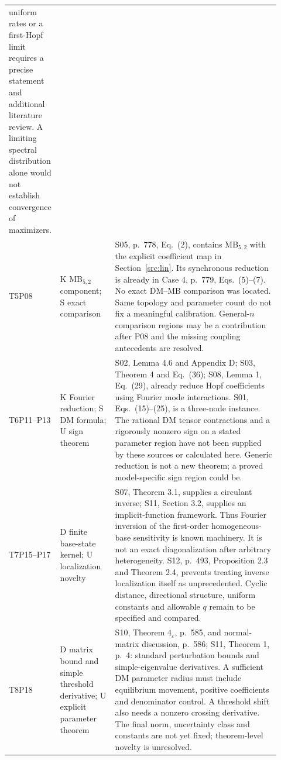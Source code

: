 \begin{longtable}{@{}>{\raggedright\arraybackslash}p{0.12\linewidth}>{\raggedright\arraybackslash}p{0.20\linewidth}>{\raggedright\arraybackslash}p{0.60\linewidth}@{}}
uniform rates or a first-Hopf limit requires a precise statement
and additional literature review. A limiting spectral distribution
alone would not establish convergence of maximizers.\\[5pt]
T5\newline P08 & K MB$_{5,2}$ component; S exact comparison &
S05, p.~778, Eq.~(2), contains MB$_{5,2}$ with the explicit coefficient
map in Section~\ref{src:lin}. Its synchronous reduction is already
in Case 4, p.~779, Eqs.~(5)--(7). No exact DM--MB comparison was
located. Same topology and parameter count do not fix a meaningful
calibration. General-$n$ comparison regions may be a contribution
after P08 and the missing coupling antecedents are resolved.\\[5pt]
T6\newline P11--P13 & K Fourier reduction; S DM formula; U sign theorem &
S02, Lemma 4.6 and Appendix D; S03, Theorem 4 and Eq.~(36);
S08, Lemma 1, Eq.~(29), already reduce Hopf coefficients using
Fourier mode interactions. S01, Eqs.~(15)--(25), is a three-node
instance. The rational DM tensor contractions and a rigorously
nonzero sign on a stated parameter region have not been supplied
by these sources or calculated here. Generic reduction is not a
new theorem; a proved model-specific sign region could be.\\[5pt]
T7\newline P15--P17 & D finite base-state kernel; U localization novelty &
S07, Theorem 3.1, supplies a circulant inverse; S11, Section 3.2,
supplies an implicit-function framework. Thus Fourier inversion of
the first-order homogeneous-base sensitivity is known machinery.
It is not an exact diagonalization after arbitrary heterogeneity.
S12, p.~493, Proposition 2.3 and Theorem 2.4, prevents treating
inverse localization itself as unprecedented. Cyclic distance,
directional structure, uniform constants and allowable $q$ remain
to be specified and compared.\\[5pt]
T8\newline P18 & D matrix bound and simple threshold derivative; U explicit parameter theorem &
S10, Theorem $4_\varepsilon$, p.~585, and normal-matrix discussion,
p.~586; S11, Theorem 1, p.~4: standard perturbation bounds and
simple-eigenvalue derivatives. A sufficient DM parameter radius
must include equilibrium movement, positive coefficients and
denominator control. A threshold shift also needs a nonzero
crossing derivative. The final norm, uncertainty class and
constants are not yet fixed; theorem-level novelty is unresolved.\\
\end{longtable}

